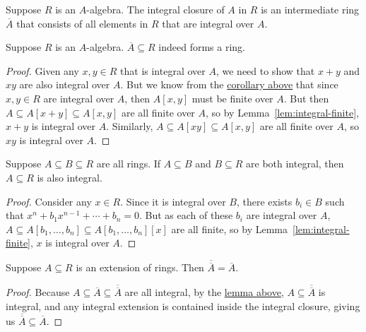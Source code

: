 \begin{definition}
    Suppose \(R\) is an \(A\)-algebra.
    The integral closure of \(A\) in \(R\) is an intermediate ring \(\overline{A}\)
    that consists of all elements in \(R\) that are integral over \(A\).
\end{definition}
\begin{proposition}
    Suppose \(R\) is an \(A\)-algebra.
    \(\overline{A} \subseteq R\) indeed forms a ring.
\end{proposition}
\begin{proof}
    Given any \(x,y \in R\) that is integral over \(A\),
    we need to show that \(x+y\) and \(xy\) are also integral over \(A\).
    But we know from the \hyperref[cor:finite-type-integral]{corollary above}
    that since \(x,y \in R\) are integral over \(A\),
    then \(A[x,y]\) must be finite over \(A\).
    But then \(A \subseteq A[x+y] \subseteq A[x,y]\) are all finite over \(A\),
    so by Lemma~\ref{lem:integral-finite}, \(x+y\) is integral over \(A\).
    Similarly, \(A \subseteq A[xy] \subseteq A[x,y]\) are all finite over \(A\),
    so \(xy\) is integral over \(A\).
\end{proof}
\begin{lemma}\label{lem:integral-stack}
    Suppose \(A \subseteq B \subseteq R\) are all rings.
    If \(A \subseteq B\) and \(B \subseteq R\) are both integral,
    then \(A \subseteq R\) is also integral.
\end{lemma}
\begin{proof}
    Consider any \(x \in R\).
    Since it is integral over \(B\), there exists \(b_i \in B\) such that
    \(x^n + b_1x^{n-1} + \cdots + b_n = 0\).
    But as each of these \(b_i\) are integral over \(A\),
    \(A \subseteq A[b_1,\hdots,b_n] \subseteq A[b_1,\hdots,b_n][x]\) are all finite,
    so by Lemma~\ref{lem:integral-finite}, \(x\) is integral over \(A\).
\end{proof}
\begin{corollary}
    Suppose \(A \subseteq R\) is an extension of rings.
    Then \(\overline{\overline{A}} = \overline{A}\).
\end{corollary}
\begin{proof}
    Because \(A \subseteq \overline{A} \subseteq \overline{\overline{A}}\) are all integral,
    by the \hyperref[lem:integral-stack]{lemma above},
    \(A \subseteq \overline{\overline{A}}\) is integral,
    and any integral extension is contained inside the integral closure,
    giving us \(\overline{\overline{A}} \subseteq \overline{A}\).
\end{proof}

